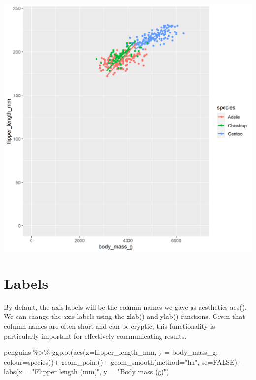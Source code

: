 \documentclass[
]{book}
\newenvironment{Shaded}{\begin{snugshade}}{\end{snugshade}}
\newcommand{\AttributeTok}[1]{\textcolor[rgb]{0.77,0.63,0.00}{#1}}
\newcommand{\ConstantTok}[1]{\textcolor[rgb]{0.00,0.00,0.00}{#1}}
\newcommand{\FunctionTok}[1]{\textcolor[rgb]{0.00,0.00,0.00}{#1}}
\newcommand{\NormalTok}[1]{#1}
\newcommand{\SpecialCharTok}[1]{\textcolor[rgb]{0.00,0.00,0.00}{#1}}
\newcommand{\StringTok}[1]{\textcolor[rgb]{0.31,0.60,0.02}{#1}}
\begin{document}
\includegraphics[width=0.8\linewidth]{images/flip}

\hypertarget{labels}{%
\section{Labels}\label{labels}}

By default, the axis labels will be the column names we gave as aesthetics aes(). We can change the axis labels using the xlab() and ylab() functions. Given that column names are often short and can be cryptic, this functionality is particularly important for effectively communicating results.

\begin{Shaded}
\begin{Highlighting}[]
\NormalTok{penguins }\SpecialCharTok{\%\textgreater{}\%} 
  \FunctionTok{ggplot}\NormalTok{(}\FunctionTok{aes}\NormalTok{(}\AttributeTok{x=}\NormalTok{flipper\_length\_mm, }
             \AttributeTok{y =}\NormalTok{ body\_mass\_g,}
             \AttributeTok{colour=}\NormalTok{species))}\SpecialCharTok{+} 
  \FunctionTok{geom\_point}\NormalTok{()}\SpecialCharTok{+}
  \FunctionTok{geom\_smooth}\NormalTok{(}\AttributeTok{method=}\StringTok{"lm"}\NormalTok{,    }
              \AttributeTok{se=}\ConstantTok{FALSE}\NormalTok{)}\SpecialCharTok{+}
  \FunctionTok{labs}\NormalTok{(}\AttributeTok{x =} \StringTok{"Flipper length (mm)"}\NormalTok{,}
       \AttributeTok{y =} \StringTok{"Body mass (g)"}\NormalTok{)}
\end{Highlighting}
\end{Shaded}
\end{document}
